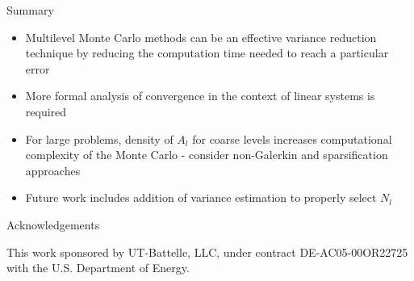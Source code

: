 \documentclass{beamer}
\begin{document}
\begin{frame}{Summary}

  \begin{itemize}
    \item Multilevel Monte Carlo methods can be an effective variance
      reduction technique by reducing the computation time needed to
      reach a particular error
      \medskip
    \item More formal analysis of convergence in the context of linear
      systems is required
      \medskip
    \item For large problems, density of $A_l$ for coarse levels
      increases computational complexity of the Monte Carlo - consider
      non-Galerkin and sparsification approaches
      \medskip
    \item Future work includes addition of variance estimation to
      properly select $N_l$
  \end{itemize}

\end{frame}

\begin{frame}{Acknowledgements}

  This work sponsored by UT-Battelle, LLC, under contract
  DE-AC05-00OR22725 with the U.S. Department of Energy.

\end{frame}

\end{document}
